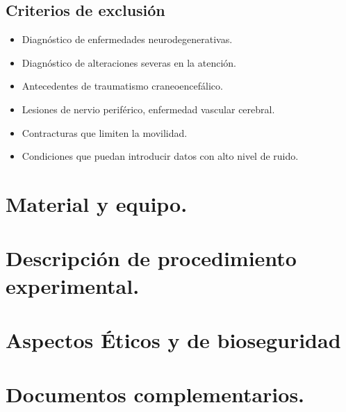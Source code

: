 \documentclass[12pt]{article}
\begin{document}
    \subsection{Criterios de exclusión}
    \begin{itemize}
        \item Diagnóstico de enfermedades neurodegenerativas.
        \item Diagnóstico de alteraciones severas en la atención.
        \item Antecedentes de traumatismo craneoencefálico.
        \item Lesiones de nervio periférico, enfermedad vascular cerebral.
        \item Contracturas que limiten la movilidad.
        \item Condiciones que puedan introducir datos con alto nivel de ruido.
    \end{itemize}
        
\section{Material y equipo.}
\section{Descripción de procedimiento experimental.}
\section{Aspectos Éticos y de bioseguridad}
\section{Documentos complementarios.}
\end{document}
